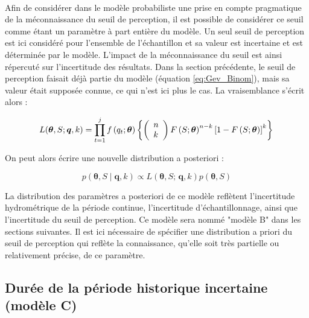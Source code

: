 \documentclass[11pt]{article}
\begin{document}
		\paragraph{}
		Afin de considérer dans le modèle probabiliste une prise en compte pragmatique de la méconnaissance du seuil de perception, il est possible de considérer ce seuil comme étant un paramètre à part entière du modèle. Un seul seuil de perception est ici considéré pour l'ensemble de l'échantillon et sa valeur est incertaine et est déterminée par le modèle. L'impact de la méconnaissance du seuil est ainsi répercuté sur l'incertitude des résultats. Dans la section précédente, le seuil de perception faisait déjà partie du modèle (équation \ref{eq:Gev_Binom}), mais sa valeur était supposée connue, ce qui n'est ici plus le cas. La vraisemblance s'écrit alors : 
		
				\begin{equation}
				L(\boldsymbol{\theta}, S ; \boldsymbol{q}, k) =\prod_{t=1}^j f\left(q_t;\boldsymbol{\theta}\right) \left\{\left(\begin{array}{l}
				n \\
				k
				\end{array}\right) F\left(S;\boldsymbol{\theta}\right)^{n-k}\left[1-F\left(S;\boldsymbol{\theta}\right)\right]^k\right\} \\
				\label{eq:Gev_Binom_uS}
				\end{equation}
				
		On peut alors écrire une nouvelle distribution a posteriori : 			
				
				\begin{equation}
					p(\boldsymbol{\theta}, S \mid \boldsymbol{q},k) \propto L(\boldsymbol{\theta},S;\,\boldsymbol{q},k) p(\boldsymbol{\theta},S)
					\label{eq:Bayes_uS}
				\end{equation}
			
		La distribution des paramètres a posteriori de ce modèle reflètent l'incertitude hydrométrique de la période continue, l'incertitude d'échantillonnage, ainsi que l'incertitude du seuil de perception. Ce modèle sera nommé "modèle B" dans les sections suivantes. Il est ici nécessaire de spécifier une distribution a priori du seuil de perception qui reflète la connaissance, qu'elle soit très partielle ou relativement précise, de ce paramètre. 

	\subsection{Durée de la période historique incertaine (modèle C)}
	\label{subsec:modC}
	
\end{document}
